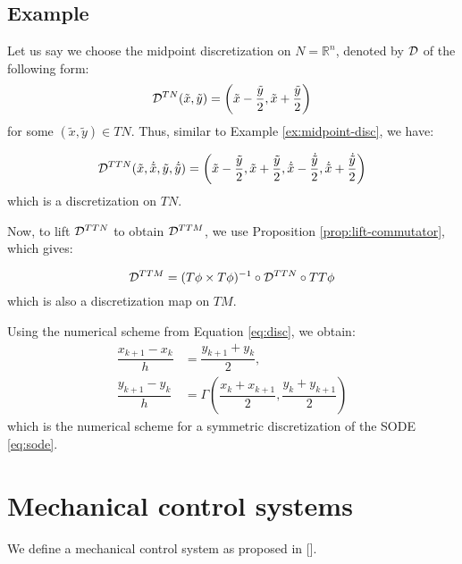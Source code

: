 \subsection{Example}
Let us say we choose the midpoint  discretization on $N={\mathbb R}^n$, denoted by $\mathcal{D}$ of the following form:
\begin{equation}
    \mathcal{D}^{TN}(\tilde{x}, \tilde{y}) = \left(\tilde{x} - \dfrac{\tilde{y}}{2}, \tilde{x} + \dfrac{\tilde{y}}{2} \right)
\end{equation}
for some $(\tilde{x}, \tilde{y}) \in TN$.
Thus, similar to Example \ref{ex:midpoint-disc}, we have:

\begin{equation}
    \mathcal{D}^{TTN}(\tilde{x}, \dot{\tilde{x}}, \tilde{y}, \dot{\tilde{y}}) = \left( \tilde{x} - \dfrac{\tilde{y}}{2}, \tilde{x} + \dfrac{\tilde{y}}{2}, \dot{\tilde{x}} - \dfrac{\dot{\tilde{y}}}{2}, \dot{\tilde{x}} + \dfrac{\dot{\tilde{y}}}{2}\right)
\end{equation}
which is a discretization on $TN$.

Now, to lift $\mathcal{D}^{TTN}$ to obtain $\mathcal{D}^{TTM}$, we use Proposition \ref{prop:lift-commutator}, which gives:

\begin{equation}
    \mathcal{D}^{TTM} = (T \phi \times T \phi)^{-1} \circ \mathcal{D}^{TTN} \circ TT\phi
\end{equation}
 which is also a discretization map on $TM$.

 Using the numerical scheme from Equation \eqref{eq:disc}, we obtain:
 \begin{equation}
     \begin{split}
         \dfrac{x_{k+1} - x_k}{h} & = \dfrac{y_{k+1} + y_k}{2}, \\
         \dfrac{y_{k+1} - y_k}{h} & = \Gamma \left(\dfrac{x_k + x_{k+1}}{2}, \dfrac{y_k + y_{k+1}}{2} \right)
     \end{split}
 \end{equation}
 which is the numerical scheme for a symmetric discretization of the SODE \eqref{eq:sode}.

\section{Mechanical control systems}

We define a mechanical control system as proposed in [\cite{10076262}].

